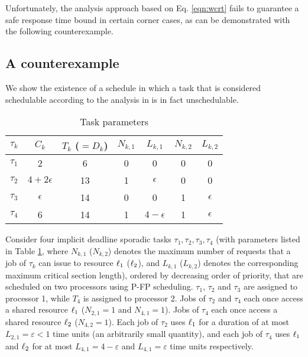 Unfortunately, the analysis approach based on Eq. \ref{eqn:wcrt} fails to guarantee a safe response time bound in certain corner cases, as can be demonstrated with the following counterexample.

\subsection{A counterexample}
\label{sec:counterexample}

We show the existence of a schedule in which a task that is considered schedulable according to the analysis in \cite{lakshmanan-2009} is in fact unschedulable.


\begin{table}
\centering
    \begin{tabular}{|c|c|c|c|c|c|c|} 
 \hline
        $\tau_k$ & $C_k$ & $T_k$ ($= D_k$) & $N_{k,1}$ & $L_{k,1}$ & $N_{k,2}$ & $L_{k,2}$\\
        \hline
        $\tau_1$ & 2             & 6  & 0 & 0 & 0 & 0\\ 
        $\tau_2$ & $4+2\epsilon$ & 13 & 1 & $\epsilon$ & 0 & 0\\
        $\tau_3$ & $\epsilon$    & 14 & 0 & 0 & 1 & $\epsilon$\\
        $\tau_4$ & 6             & 14 & 1 & $4-\epsilon$ & 1 & $\epsilon$ \\ 
        \hline
    \end{tabular}
    \caption{Task parameters}
    \label{table:parameters}
\end{table}

Consider four implicit deadline sporadic tasks ${\tau_1, \tau_2, \tau_3, \tau_4}$ (with parameters listed in Table \ref{table:parameters}, where $N_{k,1}$ ($N_{k,2}$) denotes the maximum number of requests that a job of $\tau_k$ can issue to resource $\ell_1$ ($\ell_2$), and $L_{k,1}$ ($L_{k,2}$) denotes the corresponding maximum critical section length), ordered by decreasing order of priority, that are scheduled on two processors using P-FP scheduling. $\tau_1$, $\tau_2$ and $\tau_3$ are assigned to processor 1, while $T_4$ is assigned to processor 2. Jobs of $\tau_2$ and $\tau_4$   each once access a shared resource $\ell_1$  ($N_{2,1} = 1$ and $N_{4,1} = 1$). Jobs of $\tau_4$ each once access a shared resource $\ell_2$ ($N_{4,2} = 1$). Each job of $\tau_2$ uses $\ell_1$ for a duration of at most $L_{2,1} = \varepsilon < 1$ time units (an arbitrarily small quantity), and each job of $\tau_4$ uses $\ell_1$ and $\ell_2$ for at most $L_{4,1} = 4-\varepsilon$ and $L_{4,1} = \varepsilon$ time units respectively. 

